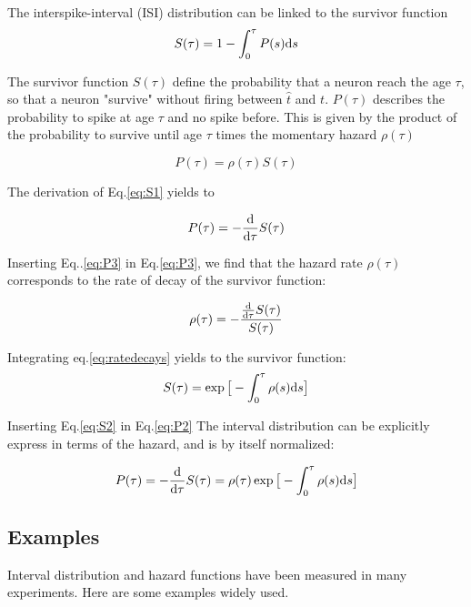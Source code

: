 \documentclass[12pt,twoside]{report}
\def \dd  {{\rm d}}
\begin{document}
The interspike-interval (ISI) distribution can be linked to the survivor function
\begin{equation}
\label{eq:S1}
S(\tau)=1-\int_0^\tau P(s) \dd s
\end{equation}


The survivor function $S(\tau)$ define the probability that a neuron reach the age $\tau$, so that a neuron "survive" without firing between $\hat{t}$ and $t$. $P(\tau)$ describes the probability to spike at age $\tau$ and no spike before. This is given by the product of the probability to survive until age $\tau$ times the momentary hazard $\rho(\tau)$

\begin{equation}
\label{eq:P2}
P(\tau)=\rho(\tau)S(\tau)
\end{equation}

The derivation of Eq.\eqref{eq:S1} yields to 

\begin{equation}
\label{eq:P3}
P(\tau)=-\frac{\dd}{\dd \tau}S(\tau)
\end{equation}


Inserting Eq..\eqref{eq:P3} in Eq.\eqref{eq:P3}, we find that the hazard rate $\rho(\tau)$ corresponds to the rate of decay of the survivor function:

\begin{equation}
\label{eq:ratedecays}
\rho(\tau)=-\frac{\frac{\dd}{\dd \tau}S(\tau)}{S(\tau)}
\end{equation}

Integrating eq.\ref{eq:ratedecays} yields to the survivor function:
\begin{equation}
\label{eq:S2}
S(\tau)=\exp\big[-\int_0^\tau\rho(s)\dd s\big]
\end{equation}

Inserting Eq.\eqref{eq:S2} in Eq.\eqref{eq:P2} The interval distribution can be explicitly express in terms of the hazard, and is by itself normalized:

\begin{equation}
\label{eq:P4}
P(\tau)=-\frac{\dd}{\dd \tau}S(\tau)=\rho(\tau)\exp\big[-\int_0^\tau\rho(s)\dd s\big]
\end{equation}



\subsection{Examples }
\label{sec:ex}

Interval distribution and hazard functions have been measured in many experiments. Here are some examples widely used.
\end{document}

